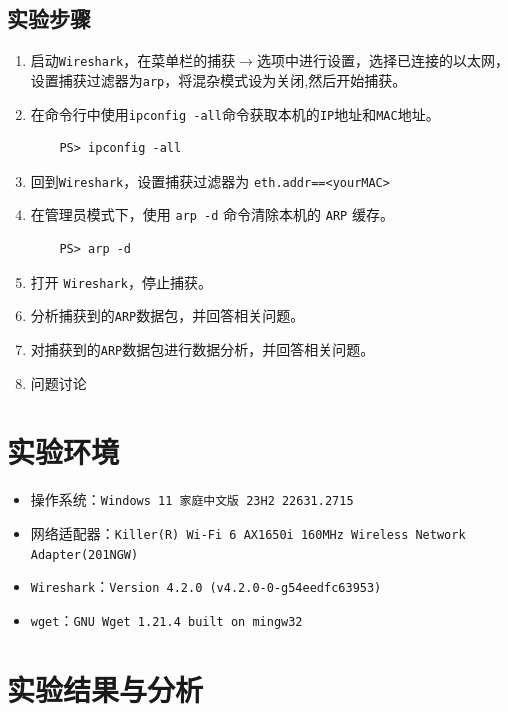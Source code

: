 \documentclass{article}
\begin{document}
\subsection{实验步骤}

\begin{enumerate}[noitemsep, label={{\arabic*})}]
  \item 启动\texttt{Wireshark}，在菜单栏的捕获\(\to \)选项中进行设置，选择已连接的以太网，设置捕获过滤器为\texttt{arp}，将混杂模式设为关闭,然后开始捕获。
  \item 在命令行中使用\texttt{ipconfig -all}命令获取本机的\texttt{IP}地址和\texttt{MAC}地址。
        \begin{lstlisting}
    PS> ipconfig -all
  \end{lstlisting}
  \item 回到\texttt{Wireshark}，设置捕获过滤器为 \texttt{eth.addr==<yourMAC>
        }
  \item 在管理员模式下，使用 \texttt{arp -d} 命令清除本机的 \texttt{ARP} 缓存。
        \begin{lstlisting}
    PS> arp -d
  \end{lstlisting}
  \item 打开 \texttt{Wireshark}，停止捕获。
  \item 分析捕获到的\texttt{ARP}数据包，并回答相关问题。
  \item 对捕获到的\texttt{ARP}数据包进行数据分析，并回答相关问题。
  \item 问题讨论
\end{enumerate}

\section{实验环境}


\begin{itemize}[noitemsep]
  \item 操作系统：\texttt{Windows 11 家庭中文版 23H2 22631.2715}
  \item 网络适配器：\texttt{Killer(R) Wi-Fi 6 AX1650i 160MHz Wireless Network Adapter(201NGW)}
  \item \texttt{Wireshark}：\texttt{Version 4.2.0 (v4.2.0-0-g54eedfc63953)}
  \item \texttt{wget}：\texttt{GNU Wget 1.21.4 built on mingw32}
\end{itemize}


\section{实验结果与分析}
\end{document}
